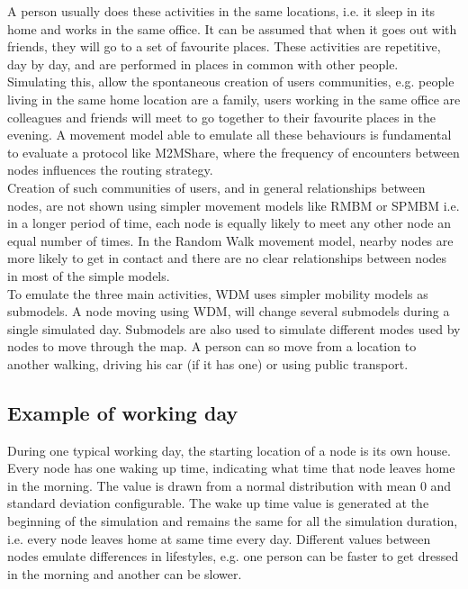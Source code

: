 A person usually does these activities in the same locations, i.e. it sleep in its home and works in the same office. It can be assumed that when it goes out with friends, they will go to a set of favourite places. These activities are repetitive, day by day, and are performed in places in common with other people. Simulating this, allow the spontaneous creation of users communities, e.g. people living in the same home location are a family, users working in the same office are colleagues and friends will meet to go together to their favourite places in the evening. A movement model able to emulate all these behaviours is fundamental to evaluate a protocol like M2MShare, where the frequency of encounters between nodes influences the routing strategy.\\

Creation of such communities of users, and in general relationships between nodes, are not shown using simpler movement models like RMBM or SPMBM i.e. in a longer period of time, each node is equally likely to meet any other node an equal number of times. In the Random Walk movement model, nearby nodes are more likely to get in contact and there are no clear relationships between nodes in most of the simple models.
\\

To emulate the three main activities, WDM uses simpler mobility models as submodels. A node moving using WDM, will change several submodels during a single simulated day. Submodels are also used to simulate different modes used by nodes to move through the map. A person can so move from a location to another walking, driving his car (if it has one) or using public transport.
\\


\subsection{Example of working day}
During one typical working day, the starting location of a node is its own house. Every node has one waking up time, indicating what time that node leaves home in the morning. The value is drawn from a normal distribution with mean 0 and standard deviation configurable. The wake up time value is generated at the beginning of the simulation and remains the same for all the simulation duration, i.e. every node leaves home at same time every day. Different values between nodes emulate differences in lifestyles, e.g. one person can be faster to get dressed in the morning and another can be slower.
\\ 

